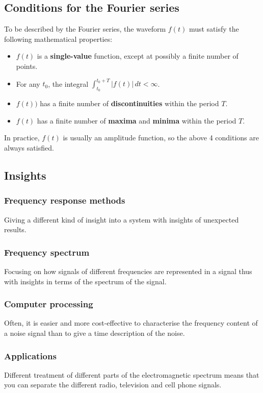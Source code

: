 \documentclass[11pt]{article}
\begin{document}
 \newpage
\subsection{Conditions for the Fourier series}
\label{sec:org6b82332}
To be described by the Fourier series, the waveform \(f(t)\) must satisfy the following mathematical properties:
\begin{itemize}
\item \(f(t)\) is a \textbf{single-value} function, except at possibly a finite number of points.
\item For any \(t_0\), the integral \(\int_{t_0}^{t_0 + T} |f(t)| \, dt < \infty\).
\item \(f(t))\) has a finite number of \textbf{discontinuities} within the period \(T\).
\item \(f(t)\) has a finite number of \textbf{maxima} and \textbf{minima} within the period \(T\).
\end{itemize}

In practice, \(f(t)\) is usually an amplitude function, so the above 4 conditions are always satisfied.
\subsection{Insights}
\label{sec:org469fdf2}

\subsubsection{Frequency response methods}
\label{sec:orgefef4ee}
Giving a different kind of insight into a system with insights of unexpected results.
\subsubsection{Frequency spectrum}
\label{sec:org129b969}
Focusing on how signals of different frequencies are represented in a signal thus with insights in terms of the spectrum of the signal.
\subsubsection{Computer processing}
\label{sec:org6827980}
Often, it is easier and more cost-effective to characterise the frequency content of a noise signal than to give a time description of the noise.
\subsubsection{Applications}
\label{sec:org7f400b4}
Different treatment of different parts of the electromagnetic spectrum means that you can separate the different radio, television and cell phone signals.
\end{document}
